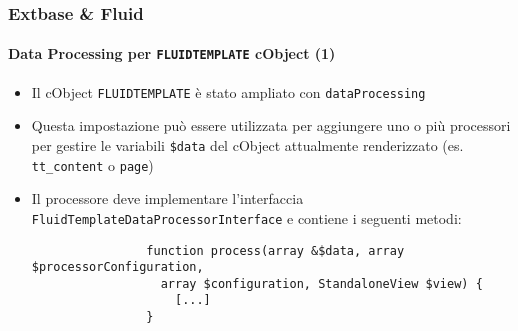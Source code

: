 \begin{frame}[fragile]
	\frametitle{Extbase \& Fluid}
	\framesubtitle{Data Processing per \texttt{FLUIDTEMPLATE} cObject (1)}

	\lstset{basicstyle=\smaller\ttfamily}

	\begin{itemize}

		\item Il cObject \texttt{FLUIDTEMPLATE} è stato ampliato con \texttt{dataProcessing}

		\item Questa impostazione può essere utilizzata per aggiungere uno o più processori per gestire
			le variabili \texttt{\$data} del cObject attualmente renderizzato\newline
			(es. \texttt{tt\_content} o \texttt{page})

		\item Il processore deve implementare l'interfaccia
			\texttt{FluidTemplateDataProcessorInterface} e contiene i seguenti metodi:

			\begin{lstlisting}
				function process(array &$data, array $processorConfiguration,
				  array $configuration, StandaloneView $view) {
				    [...]
				}
			\end{lstlisting}

	\end{itemize}

\end{frame}


